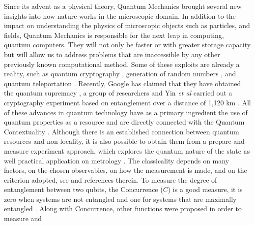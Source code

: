 \documentclass[aps,prl,preprint]{revtex4-1}
\begin{document}
	Since its advent as a physical theory, Quantum Mechanics brought
	several new insights into how nature works in the microscopic domain. In addition to the impact on understanding the physics of microscopic objects such as particles, and fields, Quantum Mechanics is responsible for the next leap in computing, quantum computers. They will not only be faster or with greater storage capacity but will allow us to address problems that are inaccessible by any other previously known computational method. Some of these exploits are already a reality, such as quantum cryptography \cite{Yin}, generation of random numbers \cite{Jacak}, and quantum teleportation \cite{Llewellyn}. 
	Recently, Google has claimed that they have obtained the quantum supremacy \cite{QSUP}, a group of researchers and Yin \textit{et al}
	carried out a cryptography experiment based on entanglement over a distance of 1,120 km \cite{Yin}. All of these advances in quantum technology have as a primary ingredient the use of quantum properties as a %
	resource \cite{Brandao} and are directly connected with the Quantum Contextuality \cite{AmaralPRL}. Although there is an established connection between quantum resources and non-locality, it is also possible to obtain them from a prepare-and-measure experiment approach, which explores the quantum nature of the state \cite{Amaral} as well practical application on  metrology \cite{Wenchao}. 
	The classicality depends on many factors, on the chosen observables, on how the measurement is made, and on the criterion adopted, see \cite{Oliveira2014} and references therein. To measure the degree of entanglement between two qubits, the Concurrence ($C$) is a good measure, it is zero when systems are not entangled and one for systems that are maximally entangled \cite{Wootters}.
	Along with Concurrence, other functions were proposed in order to measure and 
\end{document}
